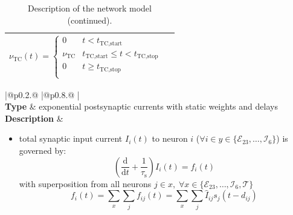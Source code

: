 \documentclass[10pt,a4paper,twoside,american]{article}
\theoremstyle{definitionstyle}
\newcommand{\diff}{\ensuremath{\text{d}}}
\newcommand{\tauS}{\tau_\text{s}}
\begin{document}
\begin{table}[H]
\begin{tabular}{
  |@{\hspace*{\marg}}p{}@{\hspace*{\marg}}
  |@{\hspace*{\marg}}p{}@{\hspace*{\marg}}
  |}
\begin{equation}
    \nu_\text{TC}(t) =
    \begin{cases}
      0 & t<t_\text{TC,start}\\
       \nu_\text{TC} & t_\text{TC,start} \le t < t_\text{TC,stop}\\
      0 & t\ge{}t_\text{TC,stop}\\
    \end{cases}
  \end{equation}\\
  \hline
\end{tabular}
\caption{Description of the network model (continued).}
\label{tab:model_description_2}
\end{table}
\clearpage
\begin{table}[H]
\begin{tabular}{
  |@{\hspace*{\marg}}p{}@{\hspace*{\marg}}
  |@{\hspace*{\marg}}p{}@{\hspace*{\marg}}
  |}
  \hline 
  \\
  \hline 
  \textbf{Type} & exponential postsynaptic currents with static weights and delays \\
  \hline 
  \textbf{Description} &
  \begin{itemize}
	\item total synaptic input current $I_i(t)$ to neuron $i$ ($\forall i \in y\in\{\mathcal{E}_{23},\ldots,\mathcal{I}_{6}\}$) is governed by:
		\begin{equation}
			\label{eq:synaptic_current}
			\left(\frac{\diff}{\diff t} + \frac{1}{\tauS}\right) I_{i} (t) = f_{i}(t)
		\end{equation}
		with superposition from all neurons $j \in x,\;\forall x\in\{\mathcal{E}_{23},\ldots,\mathcal{I}_{6}, \mathcal{T}\}$
		\begin{equation}
			f_{i} (t) = \sum_{x} \sum_{j} f_{ij} (t) = \sum_{x} \sum_{j} \hat{I}_{ij} s_{j}(t-d_{ij})
		\end{equation}

\end{itemize}
\end{tabular}
\end{table}
\end{document}
